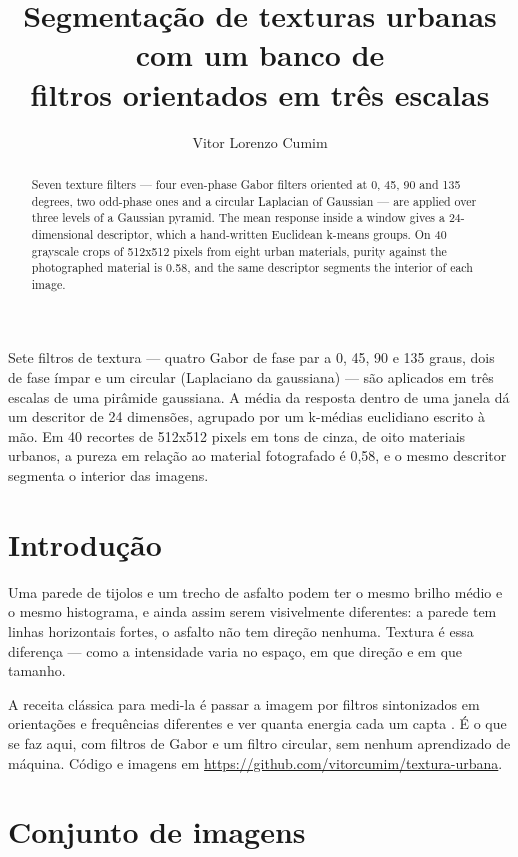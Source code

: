 \documentclass[12pt]{article}
\title{Segmentação de texturas urbanas com um banco de\\
  filtros orientados em três escalas}
\author{Vitor Lorenzo Cumim\inst{1}}
\begin{document}
\maketitle

\begin{abstract}
  Seven texture filters --- four even-phase Gabor filters oriented at 0, 45,
  90 and 135 degrees, two odd-phase ones and a circular Laplacian of Gaussian
  --- are applied over three levels of a Gaussian pyramid. The mean response
  inside a window gives a 24-dimensional descriptor, which a hand-written
  Euclidean k-means groups. On 40 grayscale crops of 512x512 pixels from eight
  urban materials, purity against the photographed material is 0.58, and the
  same descriptor segments the interior of each image.
\end{abstract}

\begin{resumo}
  Sete filtros de textura --- quatro Gabor de fase par a 0, 45, 90 e 135
  graus, dois de fase ímpar e um circular (Laplaciano da gaussiana) --- são
  aplicados em três escalas de uma pirâmide gaussiana. A média da resposta
  dentro de uma janela dá um descritor de 24 dimensões, agrupado por um
  k-médias euclidiano escrito à mão. Em 40 recortes de 512x512 pixels em tons
  de cinza, de oito materiais urbanos, a pureza em relação ao material
  fotografado é 0,58, e o mesmo descritor segmenta o interior das imagens.
\end{resumo}

\section{Introdução}

Uma parede de tijolos e um trecho de asfalto podem ter o mesmo brilho médio e
o mesmo histograma, e ainda assim serem visivelmente diferentes: a parede tem
linhas horizontais fortes, o asfalto não tem direção nenhuma. Textura é essa
diferença --- como a intensidade varia no espaço, em que direção e em que
tamanho.

A receita clássica para medi-la é passar a imagem por filtros sintonizados em
orientações e frequências diferentes e ver quanta energia cada um capta
\cite{jain:91}. É o que se faz aqui, com filtros de Gabor \cite{gabor:46} e um
filtro circular, sem nenhum aprendizado de máquina. Código e imagens em
\url{https://github.com/vitorcumim/textura-urbana}.

\section{Conjunto de imagens}
\end{document}
